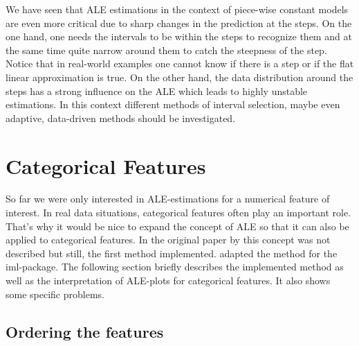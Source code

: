 \documentclass[]{krantz}
\begin{document}
We have seen that ALE estimations in the context of piece-wise constant
models are even more critical due to sharp changes in the prediction at
the steps. On the one hand, one needs the intervals to be within the
steps to recognize them and at the same time quite narrow around them to
catch the steepness of the step. Notice that in real-world examples one
cannot know if there is a step or if the flat linear approximation is
true. On the other hand, the data distribution around the steps has a
strong influence on the ALE which leads to highly unstable estimations.
In this context different methods of interval selection, maybe even
adaptive, data-driven methods should be investigated.

\section{Categorical Features}\label{categorical-features}

So far we were only interested in ALE-estimations for a numerical
feature of interest. In real data situations, categorical features often
play an important role. That's why it would be nice to expand the
concept of ALE so that it can also be applied to categorical features.
In the original paper by \citep{Apley2016} this concept was not
described but still, the first method implemented. \citep{molnar2019}
adapted the method for the iml-package. The following section briefly
describes the implemented method as well as the interpretation of
ALE-plots for categorical features. It also shows some specific
problems.

\subsection{Ordering the features}\label{ordering-the-features}
\end{document}
